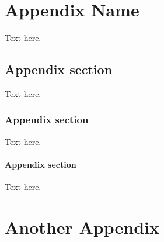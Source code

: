 \chapter{Appendix Name}
Text here.
\section{Appendix section}
Text here.
\subsection{Appendix section}
Text here.
\subsubsection{Appendix section}
Text here.
\chapter{Another Appendix}